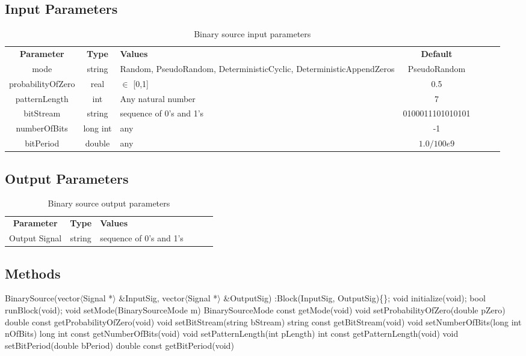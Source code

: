 \subsection*{Input Parameters}

\begin{table}[h]
	\centering
	\begin{tabular}{|c|c|p{60mm}|c|ccp{60mm}}
		\cline{1-4}
		\textbf{Parameter} & \textbf{Type} & \textbf{Values} &   \textbf{Default}& \\ \cline{1-4}
		mode & string & Random, PseudoRandom, DeterministicCyclic, DeterministicAppendZeros & PseudoRandom\\ \cline{1-4}
		probabilityOfZero & real & $\in$ [0,1] & 0.5 \\ \cline{1-4}
		patternLength & int &  Any natural number & 7 \\ \cline{1-4}
		bitStream & string & sequence of 0's and 1's & 0100011101010101 \\ \cline{1-4}
		numberOfBits & long int & any & -1 \\ \cline{1-4}
		bitPeriod & double & any & $1.0/100e9$ \\ \cline{1-4}
	\end{tabular}
	\caption{Binary source input parameters}
	\label{table:bin_sour_in_par}
\end{table}

\subsection*{Output Parameters}

\begin{table}[h]
	\centering
	\begin{tabular}{|c|c|p{60mm}|ccp{60mm}}
		\cline{1-3}
		\textbf{Parameter} & \textbf{Type} & \textbf{Values}& \\ \cline{1-3}
		Output Signal & string & sequence of 0's and 1's\\ \cline{1-3}
	\end{tabular}
	\caption{Binary source output parameters}
	\label{table:bin_sour_out_par}
\end{table}

\subsection*{Methods}

BinarySource(vector$\langle$Signal *$\rangle$ \&InputSig, vector$\langle$Signal *$\rangle$ \&OutputSig) :Block(InputSig, OutputSig)\{\};
\bigbreak	
void initialize(void);
\bigbreak	
bool runBlock(void);
\bigbreak
void setMode(BinarySourceMode m)
\bigbreak
BinarySourceMode const getMode(void)
\bigbreak	
void setProbabilityOfZero(double pZero)
\bigbreak
double const getProbabilityOfZero(void)
\bigbreak	
void setBitStream(string bStream)
\bigbreak
string const getBitStream(void)
\bigbreak	
void setNumberOfBits(long int nOfBits)
\bigbreak
long int const getNumberOfBits(void)
\bigbreak	
void setPatternLength(int pLength)
\bigbreak
int const getPatternLength(void)
\bigbreak	
void setBitPeriod(double bPeriod)
\bigbreak
double const getBitPeriod(void)

